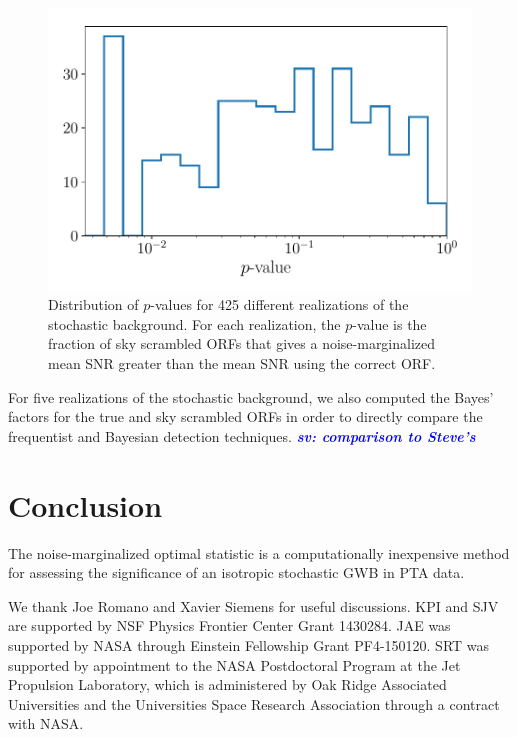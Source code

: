 \documentclass[twocolumn,aps,prd,superscriptaddress]{revtex4-1}
\newcommand{\sv}[1]{\textcolor{blue}{\it{\textbf{sv: #1}}} }
\begin{document}
\begin{figure}[htb]
	\includegraphics[width=0.95\columnwidth]{plots/os_skyscrambles.pdf}
	\caption{Distribution of $p$-values for 425 different realizations of the stochastic background. 
			For each realization, the $p$-value is the fraction of sky scrambled ORFs that gives a 
			noise-marginalized mean SNR greater than the mean SNR using the correct ORF.}
	\label{fig:skyscrambles}
\end{figure}

For five realizations of the stochastic background, we also computed the Bayes' factors for the 
true and sky scrambled ORFs in order to directly compare 
the frequentist and Bayesian detection techniques.
\sv{comparison to Steve's}


\section{Conclusion}
\label{sec:conclusion}

The noise-marginalized optimal statistic is a computationally inexpensive 
method for assessing the significance of an isotropic stochastic GWB in 
PTA data.


\acknowledgments
We thank Joe Romano and Xavier Siemens for useful discussions. 
KPI and SJV are supported by NSF Physics Frontier Center Grant 1430284.
JAE was supported by NASA through Einstein Fellowship Grant PF4-150120. 
SRT was supported by appointment to the NASA Postdoctoral Program 
at the Jet Propulsion Laboratory, which is administered by Oak Ridge Associated Universities 
and the Universities Space Research Association through a contract with NASA. 




\end{document}
